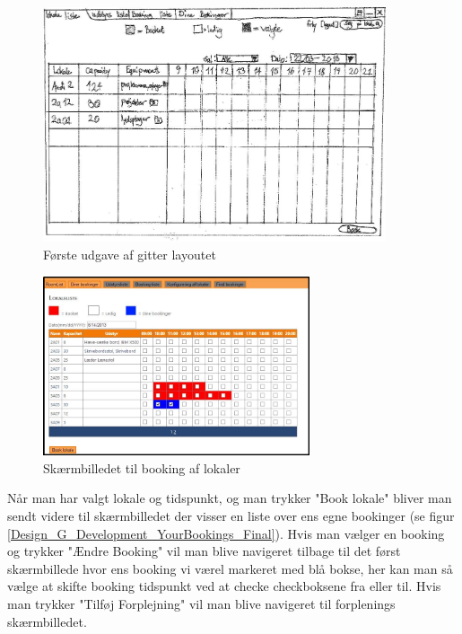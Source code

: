 \begin{figure}[h!]
  \centering
    \includegraphics[width=0.9\textwidth]{Appendix/GUI-Prototype/PaperMockup/LokaleListe_001}
  \caption{Første udgave af gitter layoutet}
\label{Design_G_Development_FirstGrid}
\end{figure}

\begin{figure}[h!]
  \centering
    \includegraphics[width=0.7\textwidth]{Appendix/GUI-Prototype/DigitalMockup/GridEksempel}
  \caption{Skærmbilledet til booking af lokaler}
\label{Design_G_Development_FinalGrid}
\end{figure}

Når man har valgt lokale og tidspunkt, og man trykker "Book lokale" bliver man sendt videre til skærmbilledet der visser en liste over ens egne bookinger (se figur \ref{Design_G_Development_YourBookings_Final}). Hvis man vælger en booking og trykker "Ændre Booking" vil man blive navigeret tilbage til det først skærmbillede hvor ens booking vi værel markeret med blå bokse, her kan man så vælge at skifte booking tidspunkt ved at checke checkboksene fra eller til. Hvis man trykker "Tilføj Forplejning" vil man blive navigeret til forplenings skærmbilledet.

